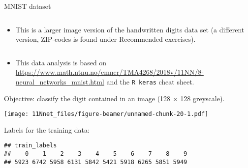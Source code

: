 \documentclass[10pt,ignorenonframetext,]{beamer}
\providecommand{\tightlist}{%
  \setlength{\itemsep}{0pt}\setlength{\parskip}{0pt}}
\begin{document}
\begin{frame}[fragile]

\begin{block}{MNIST dataset}

\(~\)

\begin{itemize}
\tightlist
\item
  This is a larger image version of the handwritten digits data set (a
  different version, ZIP-codes is found under Recommended exercises).
\end{itemize}

\(~\)

\begin{itemize}
\tightlist
\item
  This data analysis is based on
  \url{https://www.math.ntnu.no/emner/TMA4268/2018v/11NN/8-neural_networks_mnist.html}
  and the \texttt{R\ keras} cheat sheet.
\end{itemize}

\end{block}

\end{frame}

\begin{frame}

Objective: classify the digit contained in an image (128 \(\times\) 128
greyscale).

\scriptsize

\texttt{[image: 11Nnet\_files/figure-beamer/unnamed-chunk-20-1.pdf]}

\end{frame}

\begin{frame}[fragile]

Labels for the training data:

\scriptsize

\begin{verbatim}
## train_labels
##    0    1    2    3    4    5    6    7    8    9 
## 5923 6742 5958 6131 5842 5421 5918 6265 5851 5949
\end{verbatim}

\end{frame}
\end{document}

